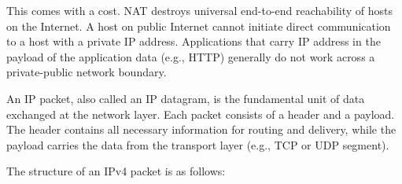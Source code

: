 This comes with a cost. NAT destroys universal end-to-end
reachability of hosts on the Internet. A host on public
Internet cannot initiate direct communication to a
host with a private IP address. Applications that carry IP
address in the payload of the application data
(e.g., HTTP) generally do not work across a private-public
network boundary.

An IP packet, also called an IP datagram, is the fundamental unit of data exchanged at the network layer. Each packet consists of a header and a payload. The header contains all necessary information for routing and delivery, while the payload carries the data from the transport layer (e.g., TCP or UDP segment).

The structure of an IPv4 packet is as follows:

